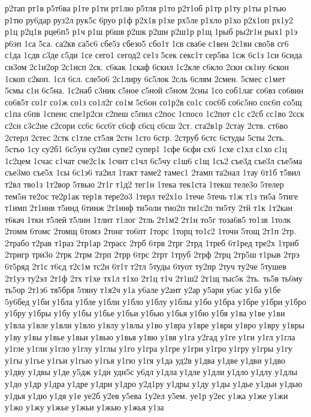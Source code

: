 {р2тап
рт1в
р5т6ва
р1те
р1ти
рт1лю
р5тля
р1то
р2т1об
р1тр
р1ту
р1ты
р1тью
р1тю
ру6дар
руз2л
рук5с
6руо
р1ф
р2х1в
р1хе
рх5ле
р1хло
р1хо
р2х1оп
рх1у2
р1ц
р2ц1в
рце6п5
р1ч
р1ш
р6шв
р2шк
р2шн
р2ш1р
р1щ
1рыб
ры2г1н
рых1
р1э
р6эп
1са
5са.
са2кв
са5с6
сбе5з
сбезо5
сбо1т
1св
сва6е
с1вен
2с1ви
сво5в
сг6
с1да
1сдв
с3де
с5ди
1се
сего1
сегод2
се1з
5сек
секс1т
сер5ва
1сж
6с1з
1си
6сида
си3ом
2с1и2ор
2с1исп
2ск.
с6как
1скаф
6скил
1с2кле
с6кло
2скн
ск1ну
6скон
1скоп
с2коп.
1сл
6сл.
сле5о6
2с1лиру
6с5лок
2сль
6слям
2смен.
5смес
с1мет
5смы
с1н
6с5на.
1с2наб
с3ник
с5ное
с5ной
с5ном
2сны
1со
соб1лаг
со6вз
со6вин
со6в5т
со1г
со1ж
со1з
со1л2г
со1м
5с6он
со1р2в
со1с
сос6б
со6с5но
сос6п
со5щ
с1па
с6пв
1спенс
спе1р2си
с2пеш
с5пил
с2пос
1спосо
1с2пот
с1с
с2сб
сс1во
2сск
с2сн
с3с2не
с2сори
сс6с
6сс6т
с6сф
с6сц
с6сш
2ст.
ста2в1р
2стау
2ств.
ст6во
2стерл
2стес
2стк
с1тле
ст5ля
2стн
1сто
6стр.
2струб
6стс
6студы
5сты
2сть.
5стьо
1су
су2б1
6с5уи
су2ни
супе2
супер1
1сфе
6сфи
сх6
1схе
с1хл
с1хо
с1ц
1с2цем
1счас
с1чат
сче2с1к
1счит
с1чл
6с5чу
с1ш6
с1щ
1съ2
съе3д
съе3л
съе5ма
съе3мо
съе5х
1сы
6с1э6
та2ил
1такт
таме2
тамес1
2тамп
та2нал
1тау
6т1б
т5вил
т2вл
тво1з
1т2вор
5твью
2т1г
т1д2
тег1н
1тека
тек1ста
1текш
теле3о
5телер
тем5н
те2ос
те2р1ак
тер1в
тере2о3
1терл
те2х1о
1тече
5течь
т1ж
т1з
ти5а
5тиге
т1имп
2т1инв
т5инд
6тинж
2т1инф
ти5оли
тио2п
ти1с2п
ти5ту
2тй
т1к
1т2кан
т6кач
1ткн
т5лей
т5лин
1тлит
т1лог
2тль
2т1м2
2т1н
то5г
тоза6в5
то1зв
1толк
2томм
6томс
2томщ
6томэ
2тонг
то6пт
1торс
1торц
то1с2
1точн
5тощ
2т1п
2тр.
2трабо
т2рав
т1раз
2тр1ар
2трасс
2трб
6трв
2трг
2трд
1треб
6т1ред
тре2х
1триб
2тригр
три3о
2трк
2трм
2трп
2трр
6трс
2трт
1труб
2трф
2трц
2тр5ш
т1рыв
2трэ
6т5ряд
2т1с
т6сд
т2с1м
тс2н
6т1т
т2тл
5туды
6туот
ту2пр
2туч
ту2че
5тушев
2т1уэ
ту2эл
2т1ф
2тх
т1хе
тх1л
т1хо
2т1ц
т1ч
2т1ш2
2т1щ
тыс5к
2ть.
ть5в
ть6му
ть5ор
2т1э6
тя5бря
5тяну
т1я2ч
у1а
у6але
у2ант
у2ар
у5ари
у6ас
у1ба
у1бе
5у6бед
у1би
у1бла
у1бле
у1бли
у1бло
у1блу
у1блы
у1бо
у1бра
у1бре
у1бри
у1бро
у1бру
у1бры
у1бу
у1бы
у1бье
у1бьи
у1бью
у1бья
у1бю
у1бя
у1ва
у1ве
у1ви
у1вла
у1вле
у1вли
у1вло
у1влу
у1влы
у1во
у1вра
у1вре
у1ври
у1вро
у1вру
у1вры
у1ву
у1вы
у1вье
у1вьи
у1вью
у1вья
у1вю
у1вя
у1га
у2гад
у1ге
у1ги
у1гл
у1гла
у1гле
у1гли
у1гло
у1глу
у1глы
у1го
у1гра
у1гре
у1гри
у1гро
у1гру
у1гры
у1гу
у1гы
у1гье
у1гьи
у1гью
у1гья
у1гю
у1гя
у1да
уд2в
у1два
у1две
у1дви
у1дво
у1дву
у1двы
у1де
у5дж
у1ди
уди5с
у6дл
у1дла
у1дле
у1дли
у1дло
у1длу
у1длы
у1до
у1др
у1дра
у1дре
у1дри
у1дро
у2д1ру
у1дры
у1ду
у1ды
у1дье
у1дьи
у1дью
у1дья
у1дю
у1дя
у1е
уе2б
у2ев
у5ева
1у2ел
у5ем.
уе1р
у2ес
у1жа
у1же
у1жи
у1жо
у1жу
у1жье
у1жьи
у1жью
у1жья
у1за
}
